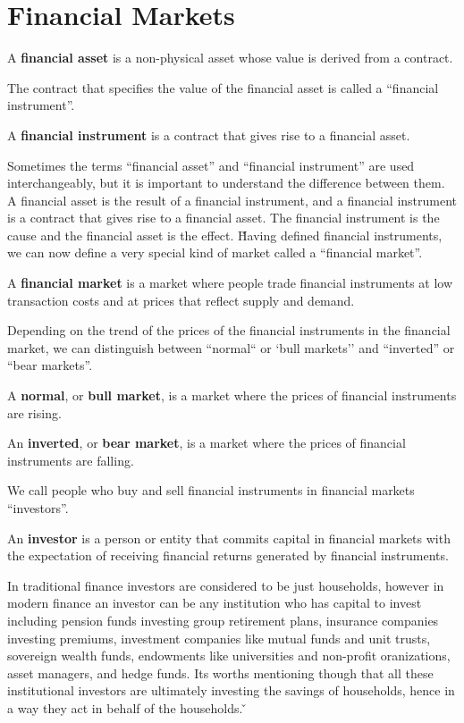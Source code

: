 \section{Financial Markets}

A \textbf{financial asset} is a non-physical asset whose value is derived from a contract.
\ed

The contract that specifies the value of the financial asset is called a ``financial instrument''.

A \textbf{financial instrument} is a contract that gives rise to a financial asset.
\ed

Sometimes the terms ``financial asset'' and ``financial instrument'' are used interchangeably, but it is important to
understand the difference between them. A financial asset is the result of a financial instrument, and a financial
instrument is a contract that gives rise to a financial asset. The financial instrument is the cause and the financial
asset is the effect. \v

Having defined financial instruments, we can now define a very special kind of market called a ``financial market''.

A \textbf{financial market} is a market where people trade financial instruments at low transaction costs and at prices
that reflect supply and demand.
\ed

Depending on the trend of the prices of the financial instruments in the financial market, we can distinguish between
``normal`` or `bull markets'' and ``inverted'' or ``bear markets''.

A \textbf{normal}, or \textbf{bull market}, is a market where the prices of financial instruments are rising.
\ed

An \textbf{inverted}, or \textbf{bear market}, is a market where the prices of financial instruments are falling.
\ed

We call people who buy and sell financial instruments in financial markets ``investors''.

\bd[Investor]
An \textbf{investor} is a person or entity that commits capital in financial markets with the expectation of receiving
financial returns generated by financial instruments.
\ed

In traditional finance investors are considered to be just households, however in modern finance an investor can be any
institution who has capital to invest including pension funds investing group retirement plans, insurance companies
investing premiums, investment companies like mutual funds and unit trusts, sovereign wealth funds, endowments like
universities and non-profit oranizations, asset managers, and hedge funds. Its worths mentioning though that all these
institutional investors are ultimately investing the savings of households, hence in a way they act in behalf of the
households. \v

